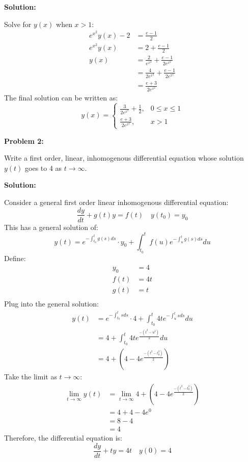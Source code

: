 \documentclass[12pt]{article}
\newenvironment{problem}[1]{
    \textbf{Problem #1:}
}{
    \rmfamily \vspace{1em}
}
\newenvironment{solution}{
    \textbf{Solution:}
    
}{
    
    \vspace{2em}
}
\begin{document}
\begin{solution}
\[    \]
Solve for \(y(x)\) when \(x>1\):
    \[
        \begin{aligned}
            e^{x^2}y(x)- 2 &= \frac{e-1}{2}\\
            e^{x^2}y(x) &= 2 + \frac{e-1}{2}\\
            y(x) &= \frac{2}{e^{x^2}} + \frac{e-1}{2e^{x^2}}\\
            &= \frac{4}{2e^{x^2}} + \frac{e-1}{2e^{x^2}}\\
            &= \frac{e+3}{2e^{x^2}}
        \end{aligned}
    \]
The final solution can be written as:
    \[
        y(x) = \begin{cases}
            \frac{3}{2e^{x^2}} + \frac{1}{2}, & 0 \leq x \leq 1 \\[0.5em]
            \frac{e+3}{2e^{x^2}}, & x > 1
        \end{cases}
    \]
\end{solution}


\begin{problem}{2}
Write a first order, linear, inhomogenous differential equation whose
solution \(y(t)\) goes to 4 as \(t \to \infty\).
\end{problem}

\begin{solution}
Consider a general first order linear inhomogenous differential equation:
    \[
        \frac{dy}{dt} + g(t)y = f(t) \quad y(t_0) = y_0
    \]
This has a general solution of:
    \[
        y(t) = e^{-\int_{t_0}^t g(s)ds} \cdot y_0 + \int_{t_0}^t f(u)e^{-\int_{u}^t g(s)ds}du
    \]
Define:
\[
    \begin{aligned}
        y_0 &= 4\\
        f(t) &= 4t\\
        g(t) &= t\\
    \end{aligned}
\]
Plug into the general solution:
    \[
        \begin{aligned}
            y(t) &= e^{-\int_{t_0}^t s ds} \cdot 4 + \int_{t_0}^t 4te^{-\int_{u}^t s ds}du\\
            &= 4 + \int_{t_0}^t 4te^{\frac{-(t^2 - u^2)}{2}}du\\
            &= 4 + (4 - 4e^{\frac{-(t^2 - t_0^2)}{2}})
        \end{aligned}
    \]
Take the limit as \(t \to \infty\):
    \[
        \begin{aligned}
            \lim_{t \to \infty} y(t) &= \lim_{t \to \infty} 4 + (4 - 4e^{\frac{-(t^2 - t_0^2)}{2}})\\
            &= 4 + 4 - 4e^0\\
            &= 8 - 4\\
            &= 4
        \end{aligned}
    \]
Therefore, the differential equation is:
    \[
        \frac{dy}{dt} + ty = 4t \quad y(0) = 4
    \]
\end{solution}
\end{document}
